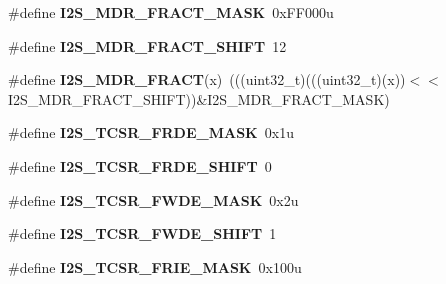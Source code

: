 \begin{DoxyCompactItemize}
\item 
\#define {\bfseries I2\+S\+\_\+\+M\+D\+R\+\_\+\+F\+R\+A\+C\+T\+\_\+\+M\+A\+SK}~0x\+F\+F000u\hypertarget{group__I2S__Register__Masks_ga0686acbd342566fcf227b91122b901cc}{}\label{group__I2S__Register__Masks_ga0686acbd342566fcf227b91122b901cc}

\item 
\#define {\bfseries I2\+S\+\_\+\+M\+D\+R\+\_\+\+F\+R\+A\+C\+T\+\_\+\+S\+H\+I\+FT}~12\hypertarget{group__I2S__Register__Masks_gab4cc6d27bd245719343b0e868ffb4bb4}{}\label{group__I2S__Register__Masks_gab4cc6d27bd245719343b0e868ffb4bb4}

\item 
\#define {\bfseries I2\+S\+\_\+\+M\+D\+R\+\_\+\+F\+R\+A\+CT}(x)~(((uint32\+\_\+t)(((uint32\+\_\+t)(x))$<$$<$I2\+S\+\_\+\+M\+D\+R\+\_\+\+F\+R\+A\+C\+T\+\_\+\+S\+H\+I\+FT))\&I2\+S\+\_\+\+M\+D\+R\+\_\+\+F\+R\+A\+C\+T\+\_\+\+M\+A\+SK)\hypertarget{group__I2S__Register__Masks_ga1a70c2cf16e7bfff509b937099b4914b}{}\label{group__I2S__Register__Masks_ga1a70c2cf16e7bfff509b937099b4914b}

\item 
\#define {\bfseries I2\+S\+\_\+\+T\+C\+S\+R\+\_\+\+F\+R\+D\+E\+\_\+\+M\+A\+SK}~0x1u\hypertarget{group__I2S__Register__Masks_gae565812ade16ef43b2c8de0da9434dc7}{}\label{group__I2S__Register__Masks_gae565812ade16ef43b2c8de0da9434dc7}

\item 
\#define {\bfseries I2\+S\+\_\+\+T\+C\+S\+R\+\_\+\+F\+R\+D\+E\+\_\+\+S\+H\+I\+FT}~0\hypertarget{group__I2S__Register__Masks_ga625ff0e116f205afc5810d46b33889e8}{}\label{group__I2S__Register__Masks_ga625ff0e116f205afc5810d46b33889e8}

\item 
\#define {\bfseries I2\+S\+\_\+\+T\+C\+S\+R\+\_\+\+F\+W\+D\+E\+\_\+\+M\+A\+SK}~0x2u\hypertarget{group__I2S__Register__Masks_ga1ee38c9bb8913b7ad39101588a3b6f81}{}\label{group__I2S__Register__Masks_ga1ee38c9bb8913b7ad39101588a3b6f81}

\item 
\#define {\bfseries I2\+S\+\_\+\+T\+C\+S\+R\+\_\+\+F\+W\+D\+E\+\_\+\+S\+H\+I\+FT}~1\hypertarget{group__I2S__Register__Masks_ga711259f1f84d00f66491a4369794c9be}{}\label{group__I2S__Register__Masks_ga711259f1f84d00f66491a4369794c9be}

\item 
\#define {\bfseries I2\+S\+\_\+\+T\+C\+S\+R\+\_\+\+F\+R\+I\+E\+\_\+\+M\+A\+SK}~0x100u\hypertarget{group__I2S__Register__Masks_gaa4df5fe488cb4d2acb0bfd546f660507}{}\label{group__I2S__Register__Masks_gaa4df5fe488cb4d2acb0bfd546f660507}


\end{DoxyCompactItemize}

